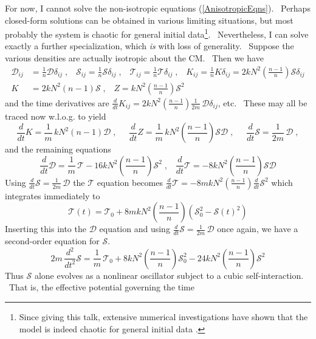 \documentclass[a4paper,12pt]{article}%
\begin{document}
For now, I cannot solve the non-isotropic equations (\ref{AnisotropicEqns}).
\ Perhaps closed-form solutions can be obtained in various limiting
situations, but most probably the system is chaotic for general initial
data\footnote{Since giving this talk, extensive numerical investigations have
shown that the model is indeed chaotic for general initial data \cite{CK}.}.
\ Nevertheless, I can solve exactly a further specialization, which \emph{is}
with loss of generality. \ Suppose the various densities are actually
isotropic about the CM. \ Then we have
\begin{align*}
\mathcal{D}_{ij}  &  =\frac{1}{n}\mathcal{D}\delta_{ij}\;,\;\;\;\mathcal{S}%
_{ij}=\frac{1}{n}\mathcal{S}\delta_{ij}\;,\;\;\;\mathcal{T}_{ij}=\frac{1}%
{n}\mathcal{T}\delta_{ij}\;,\;\;\;K_{ij}=\frac{1}{n}K\delta_{ij}%
=2kN^{2}\left(  \frac{n-1}{n}\right)  \mathcal{S}\delta_{ij}\\
K  &  =2kN^{2}\left(  n-1\right)  \mathcal{S}\;,\;\;\;Z=kN^{2}\left(
\frac{n-1}{n}\right)  \mathcal{S}^{2}%
\end{align*}
and the time derivatives are $\frac{d}{dt}K_{ij}=2kN^{2}\left(  \frac{n-1}%
{n}\right)  \frac{1}{2m}\,\mathcal{D}\delta_{ij}$, etc. \ These may all be
traced now w.l.o.g. to yield
\[
\frac{d}{dt}K=\frac{1}{m}\,kN^{2}\left(  n-1\right)  \mathcal{D}%
\;,\;\;\;\;\;\frac{d}{dt}Z=\frac{1}{m}\,kN^{2}\left(  \frac{n-1}{n}\right)
\mathcal{SD}\;,\;\;\;\;\;\frac{d}{dt}\mathcal{S}=\frac{1}{2m}\,\mathcal{D}\;,
\]
and the remaining equations%
\[
\frac{d}{dt}\mathcal{D}=\frac{1}{m}\,\mathcal{T}-16kN^{2}\left(  \frac{n-1}%
{n}\right)  \mathcal{S}^{2}\;,\;\;\;\frac{d}{dt}\mathcal{T}=-8kN^{2}\left(
\frac{n-1}{n}\right)  \mathcal{SD}%
\]
Using $\frac{d}{dt}\mathcal{S}=\frac{1}{2m}\,\mathcal{D}$ the $\mathcal{T}$
equation becomes $\frac{d}{dt}\mathcal{T}=-8mkN^{2}\left(  \frac{n-1}%
{n}\right)  \frac{d}{dt}\mathcal{S}^{2}$ which integrates immediately to
\[
\mathcal{T}\left(  t\right)  =\mathcal{T}_{0}+8mkN^{2}\left(  \frac{n-1}%
{n}\right)  \left(  \mathcal{S}_{0}^{2}-\mathcal{S}\left(  t\right)
^{2}\right)
\]
Inserting this into the $\mathcal{D}$ equation and using $\frac{d}%
{dt}\mathcal{S}=\frac{1}{2m}\,\mathcal{D}$ once again, we have a second-order
equation for $\mathcal{S}$.%
\[
2m\,\frac{d^{2}}{dt^{2}}\mathcal{S}=\frac{1}{m}\,\mathcal{T}_{0}%
+8kN^{2}\left(  \frac{n-1}{n}\right)  \mathcal{S}_{0}^{2}-24kN^{2}\left(
\frac{n-1}{n}\right)  \mathcal{S}^{2}%
\]
Thus $\mathcal{S}$ alone evolves as a nonlinear oscillator subject to a cubic
self-interaction. \ That is, the effective potential governing the time
\end{document}
